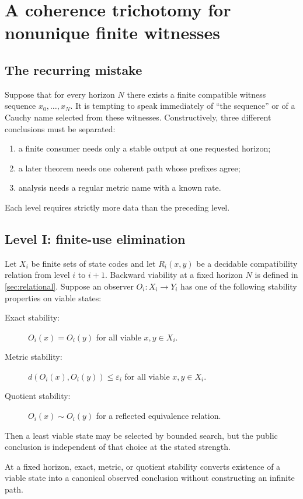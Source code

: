 \section{A coherence trichotomy for nonunique finite witnesses}\label{sec:coherence}

\subsection{The recurring mistake}

Suppose that for every horizon \(N\) there exists a finite compatible witness sequence
\(x_0,\ldots,x_N\).  It is tempting to speak immediately of ``the sequence'' or of a Cauchy name selected from these witnesses.  Constructively, three different conclusions must be separated:
\begin{enumerate}
  \item a finite consumer needs only a stable output at one requested horizon;
  \item a later theorem needs one coherent path whose prefixes agree;
  \item analysis needs a regular metric name with a known rate.
\end{enumerate}
Each level requires strictly more data than the preceding level.

\subsection{Level I: finite-use elimination}

Let \(X_i\) be finite sets of state codes and let \(R_i(x,y)\) be a decidable compatibility relation from level \(i\) to \(i+1\).  Backward viability at a fixed horizon \(N\) is defined in \cref{sec:relational}.  Suppose an observer \(O_i:X_i\to Y_i\) has one of the following stability properties on viable states:
\begin{description}
  \item[Exact stability:] \(O_i(x)=O_i(y)\) for all viable \(x,y\in X_i\).
  \item[Metric stability:] \(d(O_i(x),O_i(y))\le\varepsilon_i\) for all viable \(x,y\in X_i\).
  \item[Quotient stability:] \(O_i(x)\sim O_i(y)\) for a reflected equivalence relation.
\end{description}
Then a least viable state may be selected by bounded search, but the public conclusion is independent of that choice at the stated strength.

\begin{theorem}\label{thm:finite-erasure}
At a fixed horizon, exact, metric, or quotient stability converts existence of a viable state into a canonical observed conclusion without constructing an infinite path.
\end{theorem}

